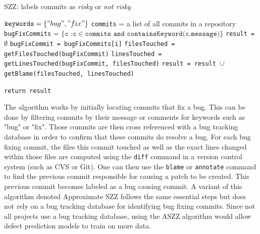 \documentclass[../main.tex]{subfiles}
\begin{document}
\begin{algorithm}
\caption{SZZ: labels commits as \textit{risky} or \textit{not risky} \cite{sliwerski2005changes}}
\label{algorithm:szz}
    \begin{algorithmic}[1]
        \State $\texttt{keywords}=\{"bug","fix"\}$
        \State \texttt{commits} = a list of all commits in a repository
        \State \texttt{bugFixCommits} = $\{\texttt{c :c} \in \texttt{commits}\texttt{ and }\texttt{containsKeyword(c.message)}\}$ 
        \State \texttt{result =} $\emptyset$
                \State \texttt{bugFixCommit = bugFixCommits[i]}
                \State \texttt{filesTouched = getFilesTouched(bugFixCommit)}
                \State \texttt{linesTouched = getLinesTouched(bugFixCommit, filesTouched)}
                \State \texttt{result = result $\cup$ getBlame(filesTouched, linesTouched)}
        \EndFor
    
        \State \texttt{return result}
    \EndProcedure
    \end{algorithmic}
\end{algorithm}

The algorithm works by initially locating commits that fix a bug. This can be done by filtering commits by their message or comments for keywords such as "bug" or "fix". Those commits are then cross referenced with a bug tracking database in order to confirm that these commits do resolve a bug. For each bug fixing commit, the files this commit touched as well as the exact lines changed within those files are computed using the \texttt{diff} command in a version control system (such as CVS or Git). One can then use the \texttt{blame} or \texttt{annotate} command to find the previous commit responsible for causing a patch to be created. This previous commit becomes labeled as a bug causing commit. A variant of this algorithm denoted Approximate SZZ follows the same essential steps but does not rely on a bug tracking database for identifying bug fixing commits. Since not all projects use a bug tracking database, using the ASZZ algorithm would allow defect prediction models to train on more data. 

\end{document}
